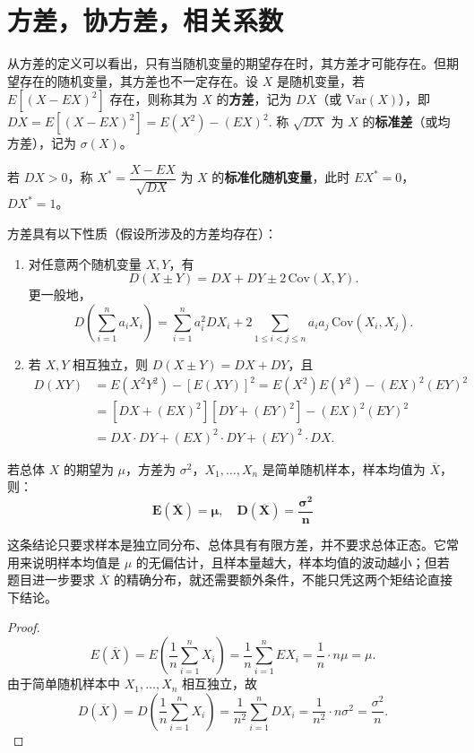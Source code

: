 \documentclass[lang=cn,11pt]{elegantbook}
\begin{document}
\section{方差，协方差，相关系数}

\begin{definition}[方差] \label{def:variance}
从方差的定义可以看出，只有当随机变量的期望存在时，其方差才可能存在。但期望存在的随机变量，其方差也不一定存在。设 \(X\) 是随机变量，若 \(E[(X - EX)^2]\) 存在，则称其为 \(X\) 的\textbf{方差}，记为 \(DX\)（或 \(\mathrm{Var}(X)\)），即
\(
DX = E[(X - EX)^2] = E(X^2) - (EX)^2.
\)
称 \(\sqrt{DX}\) 为 \(X\) 的\textbf{标准差}（或均方差），记为 \(\sigma(X)\)。

若 \(DX > 0\)，称 \(X^* = \dfrac{X - EX}{\sqrt{DX}}\) 为 \(X\) 的\textbf{标准化随机变量}，此时 \(EX^* = 0\)，\(DX^* = 1\)。
\end{definition}

\begin{property}\label{prop:variance}
方差具有以下性质（假设所涉及的方差均存在）：
\begin{enumerate}
    \item 对任意两个随机变量 \(X, Y\)，有
    \[
    D(X \pm Y) = DX + DY \pm 2\,\mathrm{Cov}(X,Y).
    \]
    更一般地，
    \[
    D\!\left(\sum_{i=1}^{n} a_i X_i\right) = \sum_{i=1}^{n} a_i^2 DX_i + 2\sum_{1 \leqslant i < j \leqslant n} a_i a_j\,\mathrm{Cov}(X_i,X_j).
    \]
    \item 若 \(X, Y\) 相互独立，则 \(D(X \pm Y) = DX + DY\)，且
\[
\begin{aligned}
D(XY) &= E(X^2 Y^2) - [E(XY)]^2 = E(X^2)E(Y^2) - (EX)^2(EY)^2 \\
&= [DX + (EX)^2][DY + (EY)^2] - (EX)^2(EY)^2 \\
&= DX \cdot DY + (EX)^2 \cdot DY + (EY)^2 \cdot DX.
\end{aligned}
\]
\end{enumerate}
\end{property}

\begin{proposition}[均值的期望与方差]\label{prop:sample-mean-moment}
    若总体 $X$ 的期望为 $\mu$，方差为 $\sigma^2$，$X_1,\dots,X_n$ 是简单随机样本，样本均值为 $\overline{X}$，则：$$\mathbf{E(\overline{X}) = \mu}, \quad \mathbf{D(\overline{X}) = \frac{\sigma^2}{n}}$$
\end{proposition}
\begin{note}
这条结论只要求样本是独立同分布、总体具有有限方差，并不要求总体正态。它常用来说明样本均值是 \(\mu\) 的无偏估计，且样本量越大，样本均值的波动越小；但若题目进一步要求 \(\overline{X}\) 的精确分布，就还需要额外条件，不能只凭这两个矩结论直接下结论。
\end{note}
\begin{proof} 
    \[ E(\overline{X}) = E\!\left(\frac{1}{n}\sum_{i=1}^{n}X_i\right) = \frac{1}{n}\sum_{i=1}^{n}EX_i = \frac{1}{n}\cdot n\mu = \mu. \] 
    由于简单随机样本中 \(X_1, \dots, X_n\) 相互独立，故 \[ D(\overline{X}) = D\!\left(\frac{1}{n}\sum_{i=1}^{n}X_i\right) = \frac{1}{n^2}\sum_{i=1}^{n}DX_i = \frac{1}{n^2}\cdot n\sigma^2 = \frac{\sigma^2}{n}. \] 
\end{proof}
\end{document}
